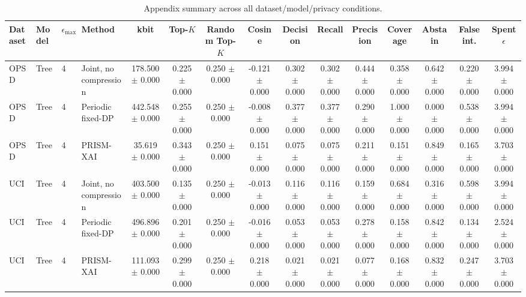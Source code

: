\begin{table}[t]
\caption{Appendix summary across all dataset/model/privacy conditions.}
\label{tab:appendix-conditions}
\centering
\scriptsize
\setlength{\tabcolsep}{2.5pt}
\begin{tabular}{llllccccccccccc}
\toprule
Dataset & Model & $\epsilon_{\max}$ & Method & kbit & Top-$K$ & Random Top-$K$ & Cosine & Decision & Recall & Precision & Coverage & Abstain & False int. & Spent $\epsilon$ \\
\midrule
OPSD & Tree & 4 & Joint, no compression & 178.500 $\pm$ 0.000 & 0.225 $\pm$ 0.000 & 0.250 $\pm$ 0.000 & -0.121 $\pm$ 0.000 & 0.302 $\pm$ 0.000 & 0.302 $\pm$ 0.000 & 0.444 $\pm$ 0.000 & 0.358 $\pm$ 0.000 & 0.642 $\pm$ 0.000 & 0.220 $\pm$ 0.000 & 3.994 $\pm$ 0.000 \\
OPSD & Tree & 4 & Periodic fixed-DP & 442.548 $\pm$ 0.000 & 0.255 $\pm$ 0.000 & 0.250 $\pm$ 0.000 & -0.008 $\pm$ 0.000 & 0.377 $\pm$ 0.000 & 0.377 $\pm$ 0.000 & 0.290 $\pm$ 0.000 & 1.000 $\pm$ 0.000 & 0.000 $\pm$ 0.000 & 0.538 $\pm$ 0.000 & 3.994 $\pm$ 0.000 \\
OPSD & Tree & 4 & PRISM-XAI & 35.619 $\pm$ 0.000 & 0.343 $\pm$ 0.000 & 0.250 $\pm$ 0.000 & 0.151 $\pm$ 0.000 & 0.075 $\pm$ 0.000 & 0.075 $\pm$ 0.000 & 0.211 $\pm$ 0.000 & 0.151 $\pm$ 0.000 & 0.849 $\pm$ 0.000 & 0.165 $\pm$ 0.000 & 3.703 $\pm$ 0.000 \\
UCI & Tree & 4 & Joint, no compression & 403.500 $\pm$ 0.000 & 0.135 $\pm$ 0.000 & 0.250 $\pm$ 0.000 & -0.013 $\pm$ 0.000 & 0.116 $\pm$ 0.000 & 0.116 $\pm$ 0.000 & 0.159 $\pm$ 0.000 & 0.684 $\pm$ 0.000 & 0.316 $\pm$ 0.000 & 0.598 $\pm$ 0.000 & 3.994 $\pm$ 0.000 \\
UCI & Tree & 4 & Periodic fixed-DP & 496.896 $\pm$ 0.000 & 0.201 $\pm$ 0.000 & 0.250 $\pm$ 0.000 & -0.016 $\pm$ 0.000 & 0.053 $\pm$ 0.000 & 0.053 $\pm$ 0.000 & 0.278 $\pm$ 0.000 & 0.158 $\pm$ 0.000 & 0.842 $\pm$ 0.000 & 0.134 $\pm$ 0.000 & 2.524 $\pm$ 0.000 \\
UCI & Tree & 4 & PRISM-XAI & 111.093 $\pm$ 0.000 & 0.299 $\pm$ 0.000 & 0.250 $\pm$ 0.000 & 0.218 $\pm$ 0.000 & 0.021 $\pm$ 0.000 & 0.021 $\pm$ 0.000 & 0.077 $\pm$ 0.000 & 0.168 $\pm$ 0.000 & 0.832 $\pm$ 0.000 & 0.247 $\pm$ 0.000 & 3.703 $\pm$ 0.000 \\
\bottomrule
\end{tabular}
\end{table}
